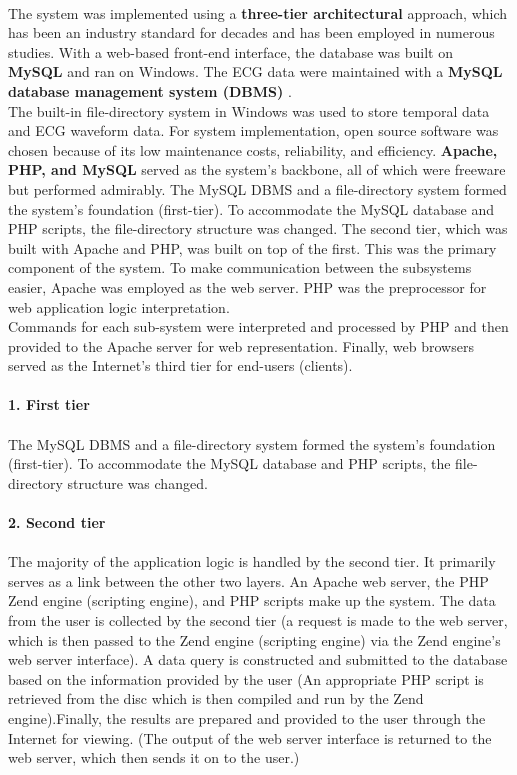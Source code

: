 \documentclass[12pt]{article}
\begin{document}
\paragraph{} The system was implemented using a \textbf{three-tier architectural} approach, which has been an industry standard for decades and has been employed in numerous studies. With a web-based front-end interface, the database was built on \textbf{MySQL} and ran on Windows. The ECG data were maintained with a \textbf{MySQL database management system (DBMS) }.\\ The built-in file-directory system in Windows was used to store temporal data and ECG waveform data. For system implementation, open source software was chosen because of its low maintenance costs, reliability, and efficiency. \textbf{Apache, PHP, and MySQL }served as the system's backbone, all of which were freeware but performed admirably. The MySQL DBMS and a file-directory system formed the system's foundation (first-tier). To accommodate the MySQL database and PHP scripts, the file-directory structure was changed. The second tier, which was built with Apache and PHP, was built on top of the first. This was the primary component of the system. To make communication between the subsystems easier, Apache was employed as the web server. PHP was the preprocessor for web application logic interpretation.\\ Commands for each sub-system were interpreted and processed by PHP and then provided to the Apache server for web representation. Finally, web browsers served as the Internet's third tier for end-users (clients).
\paragraph{\textbf{1. First tier}}
\paragraph{}  The MySQL DBMS and a file-directory system formed the system’s foundation
(first-tier). To accommodate the MySQL database and PHP scripts, the file-directory
structure was changed. 
\paragraph{\textbf{2. Second tier}}
\paragraph{}The majority of the application logic is handled by the second tier. It primarily serves as a link between the other two layers. An Apache web server, the PHP Zend engine (scripting engine), and PHP scripts make up the system. The data from the user is collected by the second tier (a request is made to the web server, which is then passed to the Zend engine (scripting engine) via the Zend engine's web server interface). A data query is constructed and submitted to the database based on the information provided by the user (An appropriate PHP script is retrieved from the disc which is then compiled and run by the Zend engine).Finally, the results are prepared and provided to the user through the Internet for viewing. (The output of the web server interface is returned to the web server, which then sends it on to the user.)
\end{document}
